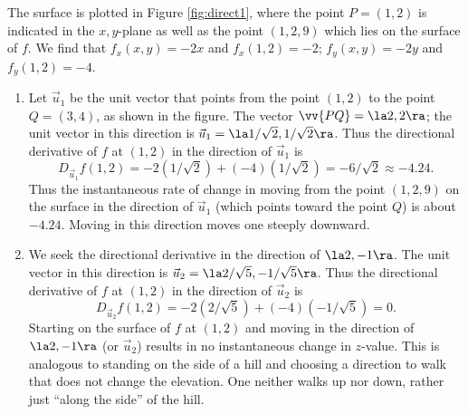 {
The surface is plotted in Figure \ref{fig:direct1}, where the point $P=(1,2)$ is indicated in the $x,y$-plane as well as the point $(1,2,9)$ which lies on the surface of $f$. We find that $f_x(x,y) = -2x$ and $f_x(1,2) = -2$; $f_y(x,y) = -2y$ and $f_y(1,2) = -4$. 
\begin{enumerate}
	\item Let $\vec u_1$ be the unit vector that points from the point $(1,2)$ to the point $Q=(3,4)$, as shown in the figure. The vector $\vv{PQ} = \la 2,2\ra$; the unit vector in this direction is $\vec u_1=\la 1/\sqrt{2}, 1/\sqrt{2}\ra$. Thus the directional derivative of $f$ at $(1,2)$ in the direction of $\vec u_1$ is
	$$D_{\vec u_1}f(1,2) = -2(1/\sqrt{2}) +(-4)(1/\sqrt{2}) = -6/\sqrt{2}\approx -4.24.$$
	Thus the instantaneous rate of change in moving from the point $(1,2,9)$ on the surface in the direction of $\vec u_1$ (which points toward the point $Q$) is about $-4.24$. Moving in this direction moves one steeply downward.
	
	\item		We seek the directional derivative in the direction of $\la 2,-1\ra$. The unit vector in this direction is $\vec u_2 = \la 2/\sqrt{5},-1/\sqrt{5}\ra$. Thus the directional derivative of $f$ at $(1,2)$ in the direction of $\vec u_2$ is
	$$D_{\vec u_2}f(1,2) = -2(2/\sqrt{5})+(-4)(-1/\sqrt{5}) = 0.$$
	Starting on the surface of $f$ at $(1,2)$ and moving in the direction of $\la 2,-1\ra$ (or $\vec u_2$) results in no instantaneous change in $z$-value. This is analogous to standing on the side of a hill and choosing a direction to walk that does not change the elevation. One neither walks up nor down, rather just ``along the side'' of the hill.
	

\end{enumerate}}
